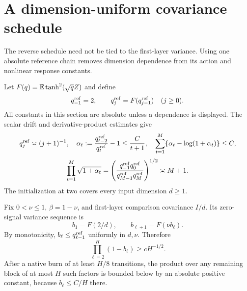\section{A dimension-uniform covariance schedule}
\label{sec:dimension-uniform-echo}
The reverse schedule need not be tied to the first-layer variance. Using one absolute reference chain removes dimension dependence from its action and nonlinear response constants.

Let $F(q)=\mathbb E\tanh^2(\sqrt q Z)$ and define
\[
 q^{\rm ref}_{-1}=2,\qquad
 q^{\rm ref}_j=F(q^{\rm ref}_{j-1})\quad(j\ge0).
\]
All constants in this section are absolute unless a dependence is displayed. The scalar drift and derivative-product estimates give
\[
 q^{\rm ref}_j\asymp(j+1)^{-1},\quad
 \alpha_t:=\frac{q^{\rm ref}_{t-2}}{q^{\rm ref}_t}-1
       \le\frac C{t+1},\quad
 \sum_{t=1}^M\{\alpha_t-\log(1+\alpha_t)\}\le C,
\]
\[
 \prod_{t=1}^M\sqrt{1+\alpha_t}
 =\left(\frac{q^{\rm ref}_{-1}q^{\rm ref}_0}
              {q^{\rm ref}_{M-1}q^{\rm ref}_M}\right)^{1/2}
 \asymp M+1.
\]
The initialization at two covers every input dimension $d\ge1$.

Fix $0<\nu\le1$, $\beta=1-\nu$, and first-layer comparison covariance $I/d$. Its zero-signal variance sequence is
\[
 b_1=F(2/d),\qquad b_{\ell+1}=F(\nu b_\ell).
\]
By monotonicity, $b_\ell\le q^{\rm ref}_{\ell-1}$ uniformly in $d,\nu$. Therefore
\[
 \prod_{\ell=2}^H(1-b_\ell)\ge cH^{-1/2}.
 \label{eq:dimension-uniform-derivative-product}
\]
After a native burn of at least $H/8$ transitions, the product over any remaining block of at most $H$ such factors is bounded below by an absolute positive constant, because $b_\ell\le C/H$ there.

